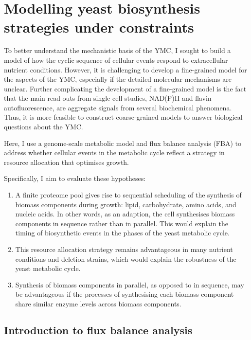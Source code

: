 \chapter{Modelling yeast biosynthesis strategies under constraints}
\label{ch:model}

To better understand the mechanistic basis of the YMC, I sought to build a model of how the cyclic sequence of cellular events respond to extracellular nutrient conditions.
However, it is challenging to develop a fine-grained model for the aspects of the YMC,
especially if the detailed molecular mechanisms are unclear.
Further complicating the development of a fine-grained model is the fact that the main read-outs from single-cell studies, NAD(P)H and flavin autofluorescence, are aggregate signals from several biochemical phenomena.
Thus, it is more feasible to construct coarse-grained models to answer biological questions about the YMC.

Here, I use a genome-scale metabolic model and flux balance analysis (FBA) to address whether cellular events in the metabolic cycle reflect a strategy in resource allocation that optimises growth.

Specifically, I aim to evaluate these hypotheses:
\begin{enumerate}
  \item A finite proteome pool gives rise to sequential scheduling of the synthesis of biomass components during growth: lipid, carbohydrate, amino acids, and nucleic acids.
        In other words, as an adaption, the cell synthesises biomass components in sequence rather than in parallel.
        This would explain the timing of biosynthetic events in the phases of the yeast metabolic cycle.
  \item This resource allocation strategy remains advantageous in many nutrient conditions and deletion strains,
        which would explain the robustness of the yeast metabolic cycle.
  \item Synthesis of biomass components in parallel, as opposed to in sequence, may be advantageous if the processes of synthesising each biomass component share similar enzyme levels across biomass components.
\end{enumerate}

\section{Introduction to flux balance analysis}
\label{sec:model-fba}

